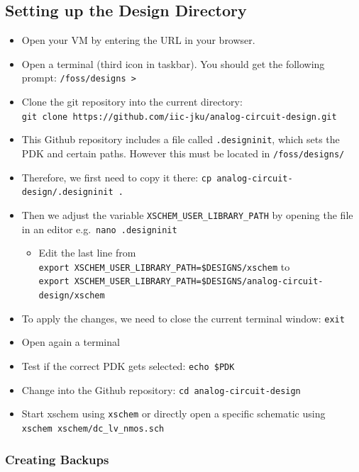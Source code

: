 \documentclass[
  a4paper,
  DIV=11,
  numbers=noendperiod]{scrartcl}
\providecommand{\tightlist}{%
  \setlength{\itemsep}{0pt}\setlength{\parskip}{0pt}}\usepackage{longtable,booktabs,array}
\begin{document}
\subsection{Setting up the Design
Directory}\label{setting-up-the-design-directory}

\begin{itemize}
\tightlist
\item
  Open your VM by entering the URL in your browser.
\item
  Open a terminal (third icon in taskbar). You should get the following
  prompt: \texttt{/foss/designs\ \textgreater{}}
\item
  Clone the git repository into the current directory:
  \texttt{git\ clone\ https://github.com/iic-jku/analog-circuit-design.git}
\item
  This Github repository includes a file called \texttt{.designinit},
  which sets the PDK and certain paths. However this must be located in
  \texttt{/foss/designs/}
\item
  Therefore, we first need to copy it there:
  \texttt{cp\ analog-circuit-design/.designinit\ .}
\item
  Then we adjust the variable \texttt{XSCHEM\_USER\_LIBRARY\_PATH} by
  opening the file in an editor e.g.~\texttt{nano\ .designinit}

  \begin{itemize}
  \tightlist
  \item
    Edit the last line from
    \texttt{export\ XSCHEM\_USER\_LIBRARY\_PATH=\$DESIGNS/xschem} to
    \texttt{export\ XSCHEM\_USER\_LIBRARY\_PATH=\$DESIGNS/analog-circuit-design/xschem}
  \end{itemize}
\item
  To apply the changes, we need to close the current terminal window:
  \texttt{exit}
\item
  Open again a terminal
\item
  Test if the correct PDK gets selected: \texttt{echo\ \$PDK}
\item
  Change into the Github repository: \texttt{cd\ analog-circuit-design}
\item
  Start xschem using \texttt{xschem} or directly open a specific
  schematic using \texttt{xschem\ xschem/dc\_lv\_nmos.sch}
\end{itemize}

\subsubsection{Creating Backups}\label{creating-backups}
\end{document}
